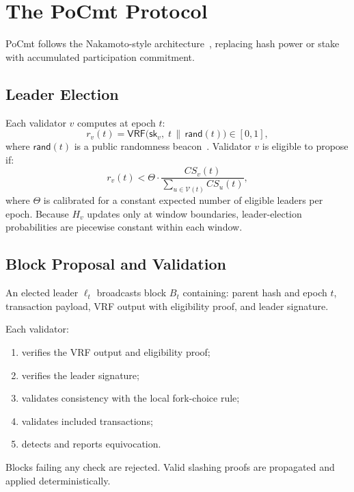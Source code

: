 \documentclass[10pt,journal,twoside]{IEEEtran}
\theoremstyle{remark}
\newcommand{\CS}{\mathit{CS}}
\begin{document}
	\section{The PoCmt Protocol}
	\label{sec:protocol}
	
	PoCmt follows the Nakamoto-style
	architecture~\cite{garay2015bitcoin,pass2017hybrid},
	replacing hash power or stake with accumulated
	participation commitment.
	
	\subsection{Leader Election}
	\label{ssec:election}
	
	Each validator $v$ computes at epoch $t$:
	\[
	r_v(t) = \mathsf{VRF}\bigl(\mathsf{sk}_v,\;
	t \,\|\, \mathsf{rand}(t)\bigr) \in [0,1],
	\]
	where $\mathsf{rand}(t)$ is a public randomness
	beacon~\cite{syta2017drand}.
	Validator $v$ is eligible to propose if:
	\[
	r_v(t) < \Theta \cdot
	\frac{\CS_v(t)}{\sum_{u \in \mathcal{V}(t)} \CS_u(t)},
	\]
	where $\Theta$ is calibrated for a constant expected
	number of eligible leaders per epoch.
	Because $H_v$ updates only at window boundaries,
	leader-election probabilities are piecewise constant
	within each window.
	
	\subsection{Block Proposal and Validation}
	\label{ssec:blocks}
	
	An elected leader $\ell_t$ broadcasts block $B_t$
	containing: parent hash and epoch $t$, transaction payload,
	VRF output with eligibility proof, and leader signature.
	
	Each validator:
	\begin{enumerate}
		\item verifies the VRF output and eligibility proof;
		\item verifies the leader signature;
		\item validates consistency with the local fork-choice
		rule;
		\item validates included transactions;
		\item detects and reports equivocation.
	\end{enumerate}
	Blocks failing any check are rejected.
	Valid slashing proofs are propagated and applied
	deterministically.
	
\end{document}
